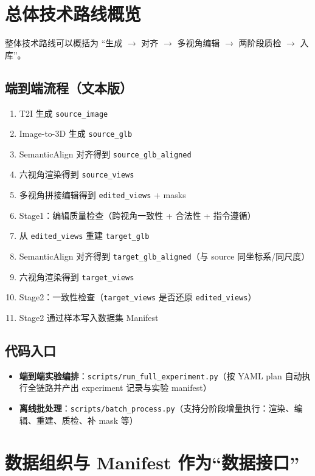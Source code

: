 \documentclass[UTF8,a4paper,11pt]{ctexart}
\begin{document}
\section{总体技术路线概览}

整体技术路线可以概括为 ``生成 $\rightarrow$ 对齐 $\rightarrow$ 多视角编辑 $\rightarrow$ 两阶段质检 $\rightarrow$ 入库''。

\subsection{端到端流程（文本版）}
\begin{enumerate}
  \item T2I 生成 \texttt{source\_image}
  \item Image-to-3D 生成 \texttt{source\_glb}
  \item SemanticAlign 对齐得到 \texttt{source\_glb\_aligned}
  \item 六视角渲染得到 \texttt{source\_views}
  \item 多视角拼接编辑得到 \texttt{edited\_views} + masks
  \item Stage1：编辑质量检查（跨视角一致性 + 合法性 + 指令遵循）
  \item 从 \texttt{edited\_views} 重建 \texttt{target\_glb}
  \item SemanticAlign 对齐得到 \texttt{target\_glb\_aligned}（与 source 同坐标系/同尺度）
  \item 六视角渲染得到 \texttt{target\_views}
  \item Stage2：一致性检查（\texttt{target\_views} 是否还原 \texttt{edited\_views}）
  \item Stage2 通过样本写入数据集 Manifest
\end{enumerate}

\subsection{代码入口}
\begin{itemize}
  \item \textbf{端到端实验编排}：\texttt{scripts/run\_full\_experiment.py}（按 YAML plan 自动执行全链路并产出 experiment 记录与实验 manifest）
  \item \textbf{离线批处理}：\texttt{scripts/batch\_process.py}（支持分阶段增量执行：渲染、编辑、重建、质检、补 mask 等）
\end{itemize}

\section{数据组织与 Manifest 作为“数据接口”}
\end{document}
